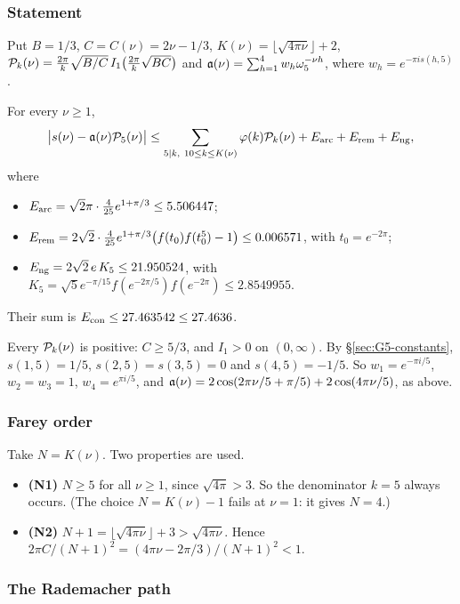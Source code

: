 \subsubsection{Statement}
Put $B=1/3$, $C=C(\nu)=2\nu-1/3$, $K(\nu)=\lfloor\sqrt{4\pi\nu}\rfloor+2$,
$\mathcal P_k(\nu)=\frac{2\pi}k\sqrt{B/C}\,I_1\big(\frac{2\pi}k\sqrt{BC}\big)$ and $\mathfrak a(\nu)=\sum_{h=1}^4w_h\omega_5^{-\nu h}$,
where $w_h=e^{-\pi is(h,5)}$.

\begin{theorem}\label{thm:G5}
For every $\nu\ge1$,
\[
\big|s(\nu)-\mathfrak a(\nu)\mathcal P_5(\nu)\big|\le\sum_{5\mid k,\ 10\le k\le K(\nu)}\varphi(k)\mathcal P_k(\nu)+E_{\rm arc}+E_{\rm rem}+E_{\rm ng},
\]
where
\begin{itemize}
\item $E_{\rm arc}=\sqrt2\pi\cdot\frac4{25}e^{1+\pi/3}\le 5.506447$;
\item $E_{\rm rem}=2\sqrt2\cdot\frac4{25}e^{1+\pi/3}\big(f(t_0)f(t_0^5)-1\big)\le0.006571$, with $t_0=e^{-2\pi}$;
\item $E_{\rm ng}=2\sqrt2\,e\,K_5\le 21.950524$, with $K_5=\sqrt5e^{-\pi/15}f(e^{-2\pi/5})f(e^{-2\pi})\le2.8549955$.
\end{itemize}
Their sum is $E_{\mathrm{con}}\le 27.463542\le27.4636$.
\end{theorem}

Every $\mathcal P_k(\nu)$ is positive: $C\ge5/3$, and $I_1>0$ on $(0,\infty)$. By \S\ref{sec:G5-constants},
$s(1,5)=1/5$, $s(2,5)=s(3,5)=0$ and $s(4,5)=-1/5$. So $w_1=e^{-\pi i/5}$, $w_2=w_3=1$, $w_4=e^{\pi i/5}$, and
$\mathfrak a(\nu)=2\cos(2\pi\nu/5+\pi/5)+2\cos(4\pi\nu/5)$, as above.

\subsubsection{Farey order}
Take $N=K(\nu)$. Two properties are used.
\begin{itemize}
\item \textbf{(N1)} $N\ge5$ for all $\nu\ge1$, since $\sqrt{4\pi}>3$. So the denominator $k=5$ always occurs. (The choice
$N=K(\nu)-1$ fails at $\nu=1$: it gives $N=4$.)
\item \textbf{(N2)} $N+1=\lfloor\sqrt{4\pi\nu}\rfloor+3>\sqrt{4\pi\nu}$. Hence $2\pi C/(N+1)^2=(4\pi\nu-2\pi/3)/(N+1)^2<1$.
\end{itemize}

\subsubsection{The Rademacher path}

